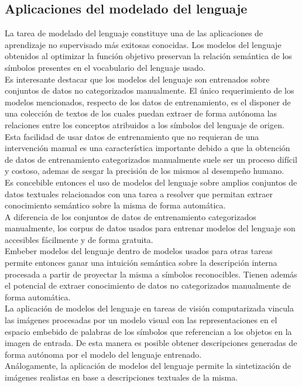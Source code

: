 \documentclass{article}
\begin{document}
	\subsection{Aplicaciones del modelado del lenguaje}
	La tarea de modelado del lenguaje constituye una de las aplicaciones de aprendizaje no supervisado más exitosas conocidas. Los modelos del lenguaje obtenidos al optimizar la función objetivo preservan la relación semántica de los símbolos presentes en el vocabulario del lenguaje usado.\\
	Es interesante destacar que los modelos del lenguaje son entrenados sobre conjuntos de datos no categorizados manualmente. El único requerimiento de los modelos mencionados, respecto de los datos de entrenamiento, es el disponer de una colección de textos de los cuales puedan extraer de forma autónoma las relaciones entre los conceptos atribuidos a los símbolos del lenguaje de origen.\\
	Esta facilidad de usar datos de entrenamiento que no requieran de una intervención manual es una característica importante debido a que la obtención de datos de entrenamiento categorizados manualmente suele ser un proceso difícil y costoso, ademas de sesgar la precisión de los mismos al desempeño humano. \\
	Es concebible entonces el uso de modelos del lenguaje sobre amplios conjuntos de datos textuales relacionados con una tarea a resolver que permitan extraer conocimiento semántico sobre la misma de forma automática.\\
	A diferencia de los conjuntos de datos de entrenamiento categorizados manualmente, los corpus de datos usados para entrenar modelos del lenguaje son accesibles fácilmente y de forma gratuita.\\
	Embeber modelos del lenguaje dentro de modelos usados para otras tareas permite entonces ganar una intuición semántica sobre la descripción interna procesada a partir de proyectar la misma a símbolos reconocibles. Tienen además el potencial de extraer conocimiento de datos no categorizados manualmente de forma automática.\\
	
	La aplicación de modelos del lenguaje en tareas de visión computarizada\cite{43ParsingScenesRecursively, 48WordImageEmbedding} vincula las imágenes procesadas por un modelo visual con las representaciones en el espacio embebido de palabras de los símbolos que referencian a los objetos en la imagen de entrada. De esta manera es posible obtener descripciones generadas de forma autónoma por el modelo del lenguaje entrenado.\\
	Análogamente, la aplicación de modelos del lenguaje permite la sintetización de imágenes realistas en base a descripciones textuales de la misma\cite{50StackGANs}.\\
	
\end{document}
